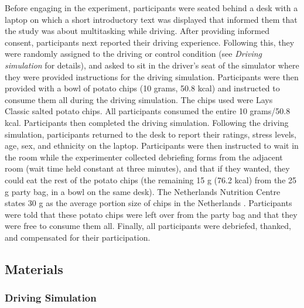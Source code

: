 \documentclass[authordate, empirical]{jote-new-article}
\begin{document}
Before engaging in the experiment, participants were seated behind a desk with a laptop on which a short introductory text was displayed that informed them that the study was about multitasking while driving. After providing informed consent, participants next reported their driving experience. Following this, they were randomly assigned to the driving or control condition (see \emph{Driving simulation} for details), and asked to sit in the driver’s seat of the simulator where they were provided instructions for the driving simulation. Participants were then provided with a bowl of potato chips (10 grams, 50.8 kcal) and instructed to consume them all during the driving simulation. The chips used were Lays Classic salted potato chips. All participants consumed the entire 10 grams/50.8 kcal. Participants then completed the driving simulation. Following the driving simulation, participants returned to the desk to report their ratings, stress levels, age, sex, and ethnicity on the laptop. Participants were then instructed to wait in the room while the experimenter collected debriefing forms from the adjacent room (wait time held constant at three minutes), and that if they wanted, they could eat the rest of the potato chips (the remaining 15 g (76.2 kcal) from the 25 g party bag, in a bowl on the same desk). The Netherlands Nutrition Centre states 30 g as the average portion size of chips in the Netherlands \parencites{VoedingscentrumND}. Participants were told that these potato chips were left over from the party bag and that they were free to consume them all. Finally, all participants were debriefed, thanked, and compensated for their participation.



\subsection{Materials}



\subsubsection{Driving Simulation }
\end{document}
